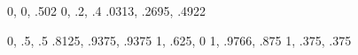 \usepackage{xcolor}


\definecolor{NavyBlue}{rgb}			{0,      0,    .502}
\definecolor{DarkMidnightBlue}{rgb}	{0,     .2,    .4}
\definecolor{DarkCerulean}{rgb}		{.0313, .2695, .4922}

\definecolor{MyTeal}{rgb}	{0, 	.5, 	.5}		%
\definecolor{MyLtTeal}{rgb}	{.8125, .9375, 	.9375}	%
\definecolor{MySand}{rgb}	{1, 	.625, 	0}		%
\definecolor{MyLtSand}{rgb}	{1, 	.9766, 	.875}	%
\definecolor{MyCoral}{rgb}	{1, 	.375, 	.375}	%
